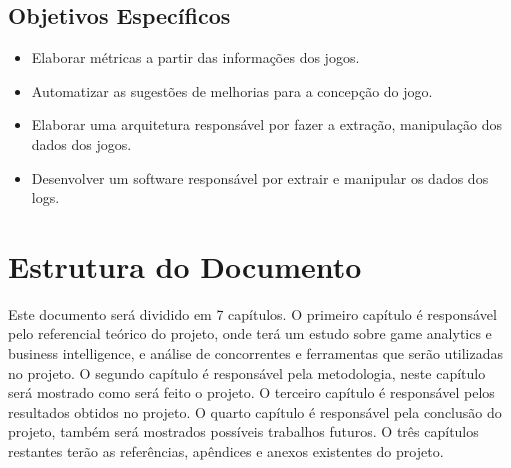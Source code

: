 	\subsection*{Objetivos Específicos}
	\begin{itemize}
		\item Elaborar métricas a partir das informações dos jogos.
		\item Automatizar as sugestões de melhorias para a concepção do jogo.
		\item Elaborar uma arquitetura responsável por fazer a extração, manipulação dos dados dos jogos.
		\item Desenvolver um software responsável por extrair e manipular os dados dos logs.
	\end{itemize}
\section*{Estrutura do Documento}
Este documento será dividido em 7 capítulos. O primeiro capítulo é responsável pelo referencial teórico do projeto, onde terá um estudo sobre game analytics e business intelligence, e análise de concorrentes e ferramentas que serão utilizadas no projeto. O segundo capítulo é responsável pela metodologia, neste capítulo será mostrado como será feito o projeto. O terceiro capítulo é responsável pelos resultados obtidos no projeto. O quarto capítulo é responsável pela conclusão do projeto, também será mostrados possíveis trabalhos futuros. O três capítulos restantes terão as referências, apêndices e anexos existentes do projeto.